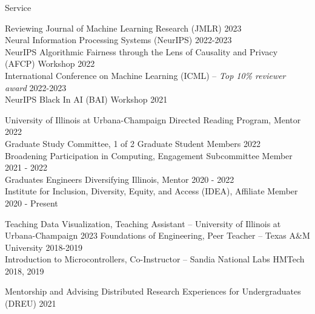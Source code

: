 \documentclass[11pt]{resume} %
\begin{document}

\begin{rSection}{Service}
    
\begin{rSubsection2}{Reviewing}
    Journal of Machine Learning Research (JMLR) \hfill 2023\\
    Neural Information Processing Systems (NeurIPS) \hfill 2022-2023\\
    NeurIPS Algorithmic Fairness through the Lens of Causality and Privacy (AFCP) Workshop \hfill 2022\\
    International Conference on Machine Learning (ICML) -- \textit{Top 10\% reviewer award} \hfill 2022-2023\\
    NeurIPS Black In AI (BAI) Workshop \hfill 2021
\end{rSubsection2}

\begin{rSubsection2}{University of Illinois at Urbana-Champaign}
    Directed Reading Program, Mentor \hfill 2022\\
    Graduate Study Committee, 1 of 2 Graduate Student
    Members \hfill 2022\\
    Broadening Participation in Computing, Engagement Subcommittee Member
    \hfill 2021 - 2022\\
    Graduates Engineers Diversifying Illinois, Mentor \hfill
    2020 - 2022\\
    Institute for Inclusion, Diversity, Equity, and
    Access (IDEA), Affiliate Member \hfill 2020 - Present\\
\end{rSubsection2}

\end{rSection}

\begin{rSection}{Teaching}
Data Visualization, Teaching Assistant -- University of Illinois at Urbana-Champaign \hfill 2023
Foundations of Engineering, Peer Teacher -- Texas A\&M University \hfill 2018-2019\\
Introduction to Microcontrollers, Co-Instructor -- Sandia National Labs HMTech \hfill 2018, 2019
\end{rSection}

\begin{rSection}{Mentorship and Advising}
    Distributed Research Experiences for Undergraduates (DREU) \hfill 2021
\end{rSection}
\end{document}
